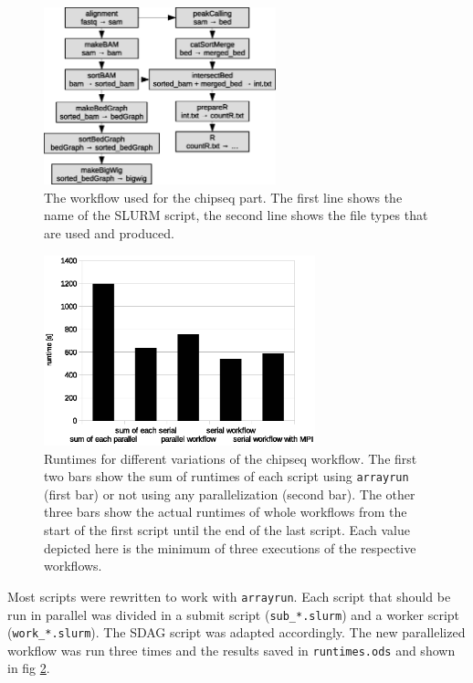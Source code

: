 \documentclass[paper=a4, 12pt]{scrartcl}
\begin{document}
\begin{figure}[ht]
	\centering
		\includegraphics[width=0.6\textwidth]{chipseq-workflow}
	\caption{The workflow used for the chipseq part. The first line shows the name of the SLURM script, the second line shows the file types that are used and produced.}
	\label{fig:chipseq-workflow}
\end{figure}

\begin{figure}[ht]
	\centering
		\includegraphics[width=0.7\textwidth]{chipseq-runtimes}
	\caption{Runtimes for different variations of the chipseq workflow. The first two bars show the sum of runtimes of each script using \texttt{arrayrun} (first bar) or not using any parallelization (second bar). The other three bars show the actual runtimes of whole workflows from the start of the first script until the end of the last script. Each value depicted here is the minimum of three executions of the respective workflows.}
	\label{fig:chipseq-runtimes}
\end{figure}

Most scripts were rewritten to work with \texttt{arrayrun}. Each script that should be run in parallel was divided in a submit script (\texttt{sub\_*.slurm}) and a worker script (\texttt{work\_*.slurm}). The SDAG script was adapted accordingly. The new parallelized workflow was run three times and the results saved in \texttt{runtimes.ods} and shown in fig \ref{fig:chipseq-runtimes}.
\end{document}
